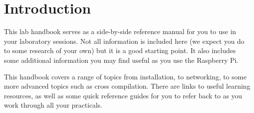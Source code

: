 \setcounter{section}{0}
\section{Introduction}
This lab handbook serves as a side-by-side reference manual for you to use in your laboratory sessions. Not all information is included here (we expect you do to some research of your own) but it is a good starting point. It also includes some additional information you may find useful as you use the Raspberry Pi.

This handbook covers a range of topics from installation, to networking, to some more advanced topics such as cross compilation. There are links to useful learning resources, as well as some quick reference guides for you to refer back to as you work through all your practicals.







